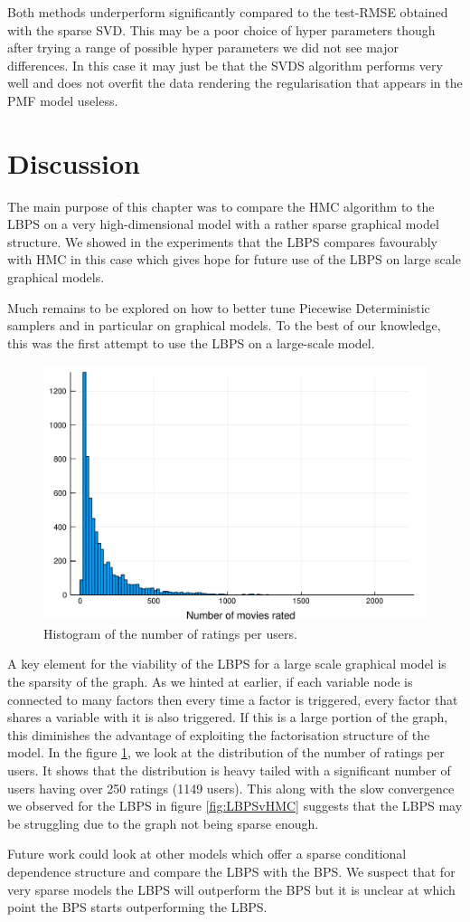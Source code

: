 Both methods underperform significantly compared to the test-RMSE obtained with the sparse SVD.  This may be a poor choice of hyper parameters though after trying a range of possible hyper parameters we did not see major differences. In this case it may just be that the SVDS algorithm performs very well and does not overfit the data rendering the regularisation that appears in the PMF model useless. 

\section{Discussion}

The main purpose of this chapter was to compare the HMC algorithm to the LBPS on a very high-dimensional model with a rather sparse graphical model structure. We showed in the experiments that the LBPS compares favourably with HMC in this case which gives hope for future use of the LBPS on large scale graphical models.

Much remains to be explored on how to better tune Piecewise Deterministic samplers and in particular on graphical models. To the best of our knowledge, this was the first attempt to use the LBPS on a large-scale model. 

\begin{figure}[!h]
\center
	\includegraphics[width=.7\textwidth]{figures/lbp/hist}
	\caption{\label{fig:nratings}Histogram of the number of ratings per users.}
\end{figure}

A key element for the viability of the LBPS for a large scale graphical model is the sparsity of the graph. As we hinted at earlier, if each variable node is connected to many factors then every time a factor is triggered, every factor that shares a variable with it is also triggered. If this is a large portion of the graph, this diminishes the advantage of exploiting the factorisation structure of the model. In the figure \ref{fig:nratings}, we look at the distribution of the number of ratings per users. It shows that the distribution is heavy tailed with a significant number of users having over 250 ratings (1149 users). This along with the slow convergence we observed for the LBPS in figure \ref{fig:LBPSvHMC} suggests that the LBPS may be struggling due to the graph not being sparse enough.

Future work could look at other models which offer a sparse conditional dependence structure and compare the LBPS with the BPS. We suspect that for very sparse models the LBPS will outperform the BPS but it is unclear at which point the BPS starts outperforming the LBPS. 



